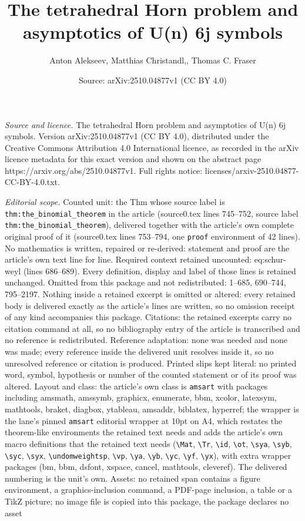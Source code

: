 \documentclass[10pt,a4paper]{amsart}
\title[The tetrahedral Horn problem and asymptotics of U(n) 6j symb]{The tetrahedral Horn problem and asymptotics of U(n) 6j symbols}
\author{Anton Alekseev, Matthias Christandl,, Thomas C. Fraser}
\date{Source: arXiv:2510.04877v1 (CC BY 4.0)}
\begin{document}
\maketitle

\noindent\emph{Source and licence.} The tetrahedral Horn problem and asymptotics of U(n) 6j symbols. Version arXiv:2510.04877v1 (CC BY 4.0), distributed under the Creative Commons Attribution 4.0 International licence, as recorded in the arXiv licence metadata for this exact version and shown on the abstract page https://arxiv.org/abs/2510.04877v1. Full rights notice: licenses/arxiv-2510.04877-CC-BY-4.0.txt.\par\smallskip

\noindent\textit{Editorial scope.} Counted unit: the Thm whose source label is \texttt{thm:the\_binomial\_theorem} in the article (source0.tex lines 745--752, source label \texttt{thm:the\_binomial\_theorem}), delivered together with the article's own complete original proof of it (source0.tex lines 753--794, one \texttt{proof} environment of 42 lines). No mathematics is written, repaired or re-derived: statement and proof are the article's own text line for line. Required context retained uncounted: eq:schur-weyl (lines 686--689). Every definition, display and label of those lines is retained unchanged. Omitted from this package and not redistributed: 1--685, 690--744, 795--2197. Nothing inside a retained excerpt is omitted or altered: every retained body is delivered exactly as the article's lines are written, so no omission receipt of any kind accompanies this package. Citations: the retained excerpts carry no citation command at all, so no bibliography entry of the article is transcribed and no reference is redistributed. Reference adaptation: none was needed and none was made; every reference inside the delivered unit resolves inside it, so no unresolved reference or citation is produced. Printed slips kept literal: no printed word, symbol, hypothesis or number of the counted statement or of its proof was altered. Layout and class: the article's own class is \texttt{amsart} with packages including amsmath, amssymb, graphicx, enumerate, bbm, xcolor, latexsym, mathtools, braket, diagbox, ytableau, amsaddr, biblatex, hyperref; the wrapper is the lane's pinned \texttt{amsart} editorial wrapper at 10pt on A4, which restates the theorem-like environments the retained text needs and adds the article's own macro definitions that the retained text needs (\texttt{\textbackslash Mat}, \texttt{\textbackslash Tr}, \texttt{\textbackslash id}, \texttt{\textbackslash ot}, \texttt{\textbackslash sya}, \texttt{\textbackslash syb}, \texttt{\textbackslash syc}, \texttt{\textbackslash syx}, \texttt{\textbackslash undomweightsp}, \texttt{\textbackslash vp}, \texttt{\textbackslash ya}, \texttt{\textbackslash yb}, \texttt{\textbackslash yc}, \texttt{\textbackslash yf}, \texttt{\textbackslash yx}), with extra wrapper packages (bm, bbm, dsfont, xspace, cancel, mathtools, cleveref). The delivered numbering is the unit's own. Assets: no retained span contains a figure environment, a graphics-inclusion command, a PDF-page inclusion, a table or a TikZ picture; no image file is copied into this package, the package declares no asset 
\end{document}
